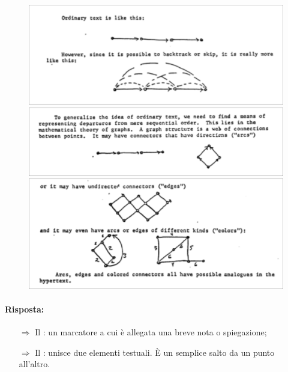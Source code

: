 \subsubsection{}
\pagebreak
{}

\begin{figure}[h]
    \centering
    \includegraphics[scale=0.25]{images/H1.png}
    \includegraphics[scale=0.25]{images/H2.png}
    \includegraphics[scale=0.25]{images/H3.png}
\end{figure}


\paragraph{Risposta:}

\begin{itemize}
    \item [$\Rightarrow$] Il : un marcatore a cui è allegata una breve nota o spiegazione;
    \item [$\Rightarrow$] Il : unisce due elementi testuali. È un semplice salto da un punto all'altro.
\end{itemize}

